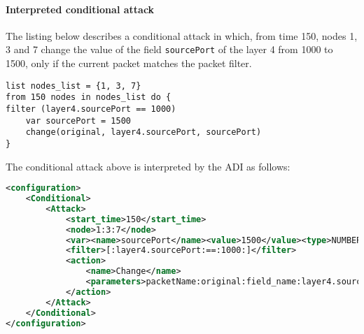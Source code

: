 \paragraph{Interpreted conditional attack}
The listing below describes a conditional attack in which, from time 150, nodes 1, 3 and 7 change the value of the field \texttt{sourcePort} of the layer 4 from 1000 to 1500, only if the current packet matches the packet filter.
%
\begin{lstlisting}[language={adl}]
list nodes_list = {1, 3, 7}
from 150 nodes in nodes_list do {
filter (layer4.sourcePort == 1000)    
    var sourcePort = 1500
    change(original, layer4.sourcePort, sourcePort)
}
\end{lstlisting}
%
The conditional attack above is interpreted by the ADI as follows:
%
\begin{lstlisting}[language={xml}]
<configuration>
    <Conditional>
        <Attack>
            <start_time>150</start_time>
            <node>1:3:7</node>
            <var><name>sourcePort</name><value>1500</value><type>NUMBER</type></var>
            <filter>[:layer4.sourcePort:==:1000:]</filter>
            <action>
                <name>Change</name>
                <parameters>packetName:original:field_name:layer4.sourcePort:value:sourcePort</parameters>
            </action>
        </Attack>
    </Conditional>
</configuration>
\end{lstlisting}


